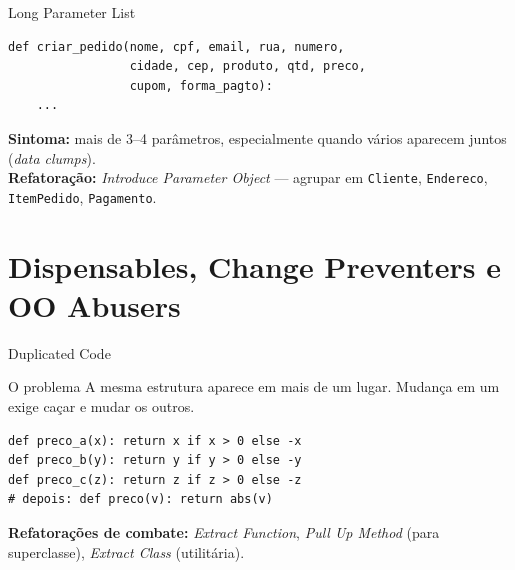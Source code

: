 \documentclass[aspectratio=169]{beamer}
\begin{document}
\begin{frame}[fragile]{Long Parameter List}
\begin{lstlisting}
def criar_pedido(nome, cpf, email, rua, numero,
                 cidade, cep, produto, qtd, preco,
                 cupom, forma_pagto):
    ...
\end{lstlisting}
  \footnotesize
  \textbf{Sintoma:} mais de 3--4 parâmetros, especialmente quando vários
  aparecem juntos (\emph{data clumps}).\\
  \textbf{Refatoração:} \emph{Introduce Parameter Object} ---
  agrupar em \texttt{Cliente}, \texttt{Endereco}, \texttt{ItemPedido}, \texttt{Pagamento}.
\end{frame}

\section{Dispensables, Change Preventers e OO Abusers}

\begin{frame}[fragile]{Duplicated Code}
  \begin{alertblock}{O problema}
    A mesma estrutura aparece em mais de um lugar.
    Mudança em um exige caçar e mudar os outros.
  \end{alertblock}
\begin{lstlisting}
def preco_a(x): return x if x > 0 else -x
def preco_b(y): return y if y > 0 else -y
def preco_c(z): return z if z > 0 else -z
# depois: def preco(v): return abs(v)
\end{lstlisting}
  \footnotesize\textbf{Refatorações de combate:} \emph{Extract Function},
  \emph{Pull Up Method} (para superclasse), \emph{Extract Class} (utilitária).
\end{frame}
\end{document}
